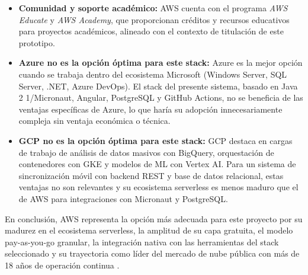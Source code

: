 \begin{itemize}
    \item \textbf{Comunidad y soporte académico:} AWS cuenta con el
    programa \textit{AWS Educate} y \textit{AWS Academy}, que
    proporcionan créditos y recursos educativos para proyectos
    académicos, alineado con el contexto de titulación de este
    prototipo.

    \item \textbf{Azure no es la opción óptima para este stack:}
    Azure es la mejor opción cuando se trabaja dentro del ecosistema
    Microsoft (Windows Server, SQL Server, .NET, Azure DevOps). El
    stack del presente sistema, basado en Java 2 1/Micronaut, Angular,
    PostgreSQL y GitHub Actions, no se beneficia de las ventajas
    específicas de Azure, lo que haría su adopción innecesariamente
    compleja sin ventaja económica o técnica.

    \item \textbf{GCP no es la opción óptima para este stack:} GCP
    destaca en cargas de trabajo de análisis de datos masivos con
    BigQuery, orquestación de contenedores con GKE y modelos de ML
    con Vertex AI. Para un sistema de sincronización móvil con backend
    REST y base de datos relacional, estas ventajas no son relevantes
    y su ecosistema serverless es menos maduro que el de AWS para
    integraciones con Micronaut y PostgreSQL.
\end{itemize}

En conclusión, AWS representa la opción más adecuada para este proyecto
por su madurez en el ecosistema serverless, la amplitud de su capa
gratuita, el modelo pay-as-you-go granular, la integración nativa con
las herramientas del stack seleccionado y su trayectoria como líder
del mercado de nube pública con más de 18 años de operación continua
\cite{aws_vs_azure_gcp_2025}.